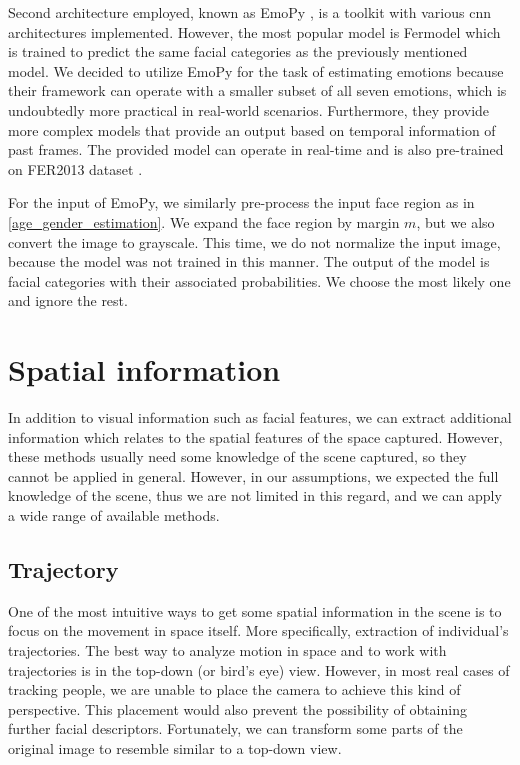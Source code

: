             Second architecture employed, known as EmoPy \cite{emopy}, is a toolkit with various \gls{cnn} architectures implemented. However, the most popular model is Fermodel which is trained to predict the same facial categories as the previously mentioned model. We decided to utilize EmoPy for the task of estimating emotions because their framework can operate with a smaller subset of all seven emotions, which is undoubtedly more practical in real-world scenarios. Furthermore, they provide more complex models that provide an output based on temporal information of past frames. The provided model can operate in real-time and is also pre-trained on FER2013 dataset \cite{goodfellow2013challenges}.
            
            For the input of EmoPy, we similarly pre-process the input face region as in \ref{age_gender_estimation}. We expand the face region by margin $m$, but we also convert the image to grayscale. This time, we do not normalize the input image, because the model was not trained in this manner. The output of the model is facial categories with their associated probabilities. We choose the most likely one and ignore the rest.
        
    \section{Spatial information}
        In addition to visual information such as facial features, we can extract additional information which relates to the spatial features of the space captured. However, these methods usually need some knowledge of the scene captured, so they cannot be applied in general. However, in our assumptions, we expected the full knowledge of the scene, thus we are not limited in this regard, and we can apply a wide range of available methods.
        
        \subsection{Trajectory}
            One of the most intuitive ways to get some spatial information in the scene is to focus on the movement in space itself. More specifically, extraction of individual's trajectories. The best way to analyze motion in space and to work with trajectories is in the top-down (or bird's eye) view. However, in most real cases of tracking people, we are unable to place the camera to achieve this kind of perspective. This placement would also prevent the possibility of obtaining further facial descriptors. Fortunately, we can transform some parts of the original image to resemble similar to a top-down view. 
            
